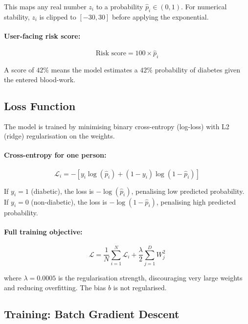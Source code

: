 This maps any real number $z_i$ to a probability $\hat{p}_i \in (0,1)$. For numerical stability, $z_i$ is clipped to $[-30, 30]$ before applying the exponential.

\paragraph{User-facing risk score:}
\begin{equation}
    \text{Risk score} = 100 \times \hat{p}_i
    \label{eq:risk-score}
\end{equation}

A score of $42\%$ means the model estimates a $42\%$ probability of diabetes given the entered blood-work.

\subsection{Loss Function}

The model is trained by minimising binary cross-entropy (log-loss) with L2 (ridge) regularisation on the weights.

\paragraph{Cross-entropy for one person:}
\begin{equation}
    \mathcal{L}_i = -\left[ y_i \log(\hat{p}_i) + (1 - y_i)\log(1 - \hat{p}_i) \right]
    \label{eq:cross-entropy}
\end{equation}

If $y_i = 1$ (diabetic), the loss is $-\log(\hat{p}_i)$, penalising low predicted probability. If $y_i = 0$ (non-diabetic), the loss is $-\log(1 - \hat{p}_i)$, penalising high predicted probability.

\paragraph{Full training objective:}
\begin{equation}
    \mathcal{L} = \frac{1}{N}\sum_{i=1}^{N} \mathcal{L}_i + \frac{\lambda}{2}\sum_{j=1}^{D} W_j^2
    \label{eq:full-loss}
\end{equation}

where $\lambda = 0.0005$ is the regularisation strength, discouraging very large weights and reducing overfitting. The bias $b$ is not regularised.

\subsection{Training: Batch Gradient Descent}

